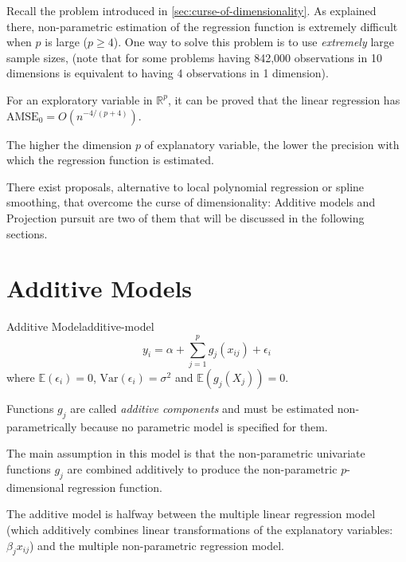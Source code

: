 Recall the problem introduced in \cref{sec:curse-of-dimensionality}. As explained
there, non-parametric estimation of the regression function is extremely difficult
when $p$ is large ($p \geq 4$). One way to solve this problem
is to use \emph{extremely} large sample sizes, (note that
for some problems having 842,000 observations in 10 dimensions is
equivalent to having 4 observations in 1 dimension).

For an exploratory variable in $\mathds R^p$, it can be proved that
the linear regression has $\text{AMSE}_0 = O(n^{-4/(p+4)})$.

The higher the dimension $p$ of explanatory variable, the lower the precision with which
the regression function is estimated.

There exist proposals, alternative to local polynomial regression or spline smoothing,
that overcome the curse of dimensionality:
Additive models and Projection pursuit are two of them that will be discussed in the
following sections.

\pagebreak
\section{Additive Models}

\begin{definition}{Additive Model}{additive-model}
    \begin{equation*}
        y_i = \alpha + \sum_{j=1}^p g_j(x_{ij}) + \epsilon_i
    \end{equation*}
    where $\mathds E(\epsilon_i) = 0$, $\text{Var}(\epsilon_i) = \sigma^2$ and
    $\mathds E(g_j(X_{j})) = 0$.

    Functions $g_j$ are called \emph{additive components} and must be estimated
    non-parametrically because no parametric model is specified for them.

    \tcblower

    The main assumption in this model is that the non-parametric univariate functions
    $g_j$ are combined additively to produce the non-parametric $p$-dimensional
    regression function.

    \begin{note}
        The additive model is halfway between the multiple linear regression model
        (which additively combines linear transformations of the explanatory variables: $\beta_jx_{ij}$)
        and the multiple non-parametric regression model.
    \end{note}
\end{definition}

